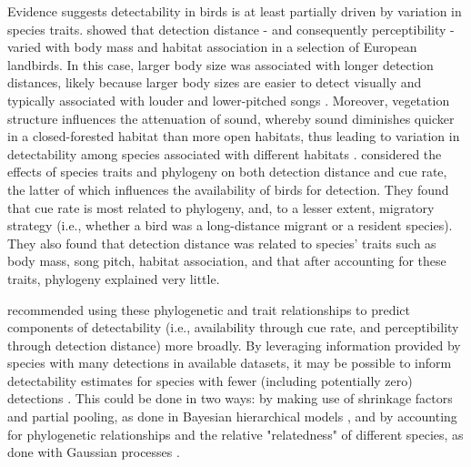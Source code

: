 \par Evidence suggests detectability in birds is at least partially driven by variation in species traits.
\citet{johnston_species_2014} showed that detection distance - and consequently perceptibility - varied with body mass and habitat association in a selection of European landbirds.
In this case, larger body size was associated with longer detection distances, likely because  larger body sizes are easier to detect visually and typically associated with louder and lower-pitched songs \citep{bowman_adaptive_1979, fletcher_acoustics_1999, ryan_role_1985}.
Moreover, vegetation structure influences the attenuation of sound, whereby sound diminishes quicker in a closed-forested habitat than more open habitats, thus leading to variation in detectability among species associated with different habitats \citep{waide_tropical_1988, yip_sound_2017}.
\citet{solymos_phylogeny_2018} considered the effects of species traits and phylogeny on both detection distance and cue rate, the latter of which influences the availability of birds for detection.
They found that cue rate is most related to phylogeny, and, to a lesser extent, migratory strategy (i.e., whether a bird was a long-distance migrant or a resident species).
They also found that detection distance was related to species’ traits such as body mass, song pitch, habitat association, and that after accounting for these traits, phylogeny explained very little.

\par \citet{solymos_phylogeny_2018} recommended using these phylogenetic and trait relationships to predict components of detectability (i.e., availability through cue rate, and perceptibility through detection distance) more broadly.
 By leveraging information provided by species with many detections in available datasets, it may be possible to inform detectability estimates for species with fewer (including potentially zero) detections \citep{sollmann_hierarchical_2016, pacifici_guidelines_2014, zipkin_impacts_2009, white_conservation_2013}.
This could be done in two ways: by making use of shrinkage factors and partial pooling, as done in Bayesian hierarchical models \citep{gelman_what_2021, gelman_bayesian_2006}, and by accounting for phylogenetic relationships and the relative "relatedness" of different species, as done with Gaussian processes \citep{bernardo_regression_1998, mcelreath_continous_2020}.

